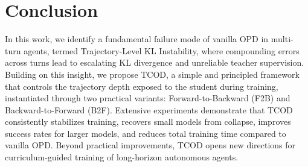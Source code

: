 \documentclass{article} %
\newcommand{\ours}{TCOD\xspace}
\begin{document}
\section{Conclusion}

In this work, we identify a fundamental failure mode of vanilla OPD in multi-turn agents, termed Trajectory-Level KL Instability, where compounding errors across turns lead to escalating KL divergence and unreliable teacher supervision. 
Building on this insight, we propose \ours, a simple and principled framework that controls the trajectory depth exposed to the student during training, instantiated through two practical variants: Forward-to-Backward (F2B) and Backward-to-Forward (B2F).
Extensive experiments demonstrate that \ours consistently stabilizes training, recovers small models from collapse, improves success rates for larger models, and reduces total training time compared to vanilla OPD.
Beyond practical improvements, \ours opens new directions for curriculum-guided training of long-horizon autonomous agents.






\end{document}

